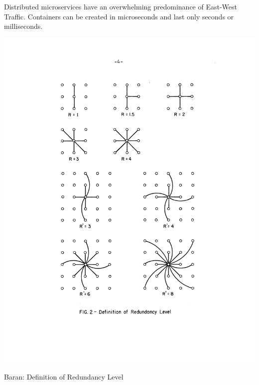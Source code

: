\documentclass[../HFT-main.tex]{subfiles}
\begin{document}
 Distributed microservices have an overwhelming predominance of East-West Traffic.  Containers can be created in microseconds and last only seconds or milliseconds.
 

 
 \begin{marginfigure}
  \includegraphics[width=\linewidth]{../figures/Baran-redundancy.pdf}
  \caption{Baran: Definition of Redundancy Level}
    \vspace{12pt}
\end{marginfigure}
\end{document}
